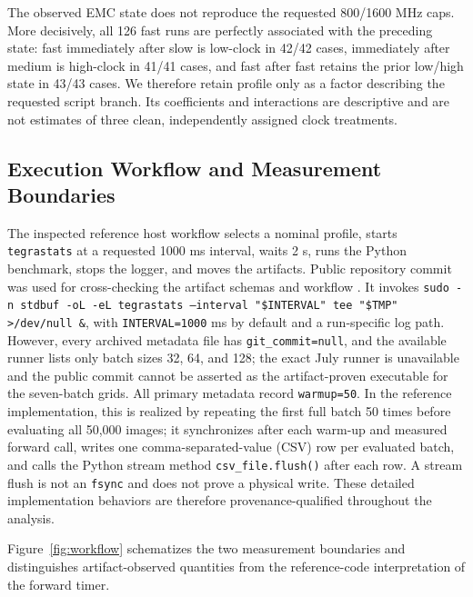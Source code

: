 \documentclass[electronics,article,submit,pdftex,moreauthors]{Definitions/mdpi}
\providecommand{\figref}[1]{Figure~\ref{#1}}
\begin{document}
The observed EMC state does not reproduce the requested 800/1600 MHz caps. More decisively, all 126 fast runs are perfectly associated with the preceding state: fast immediately after slow is low-clock in 42/42 cases, immediately after medium is high-clock in 41/41 cases, and fast after fast retains the prior low/high state in 43/43 cases. We therefore retain profile only as a factor describing the requested script branch. Its coefficients and interactions are descriptive and are not estimates of three clean, independently assigned clock treatments.

\subsection{Execution Workflow and Measurement Boundaries}

The inspected reference host workflow selects a nominal profile, starts \texttt{tegrastats} at a requested 1000 ms interval, waits 2 s, runs the Python benchmark, stops the logger, and moves the artifacts. Public repository commit \texttt{} was used for cross-checking the artifact schemas and workflow \cite{benchmarkrepo}. It invokes \texttt{sudo -n stdbuf -oL -eL tegrastats --interval "\$INTERVAL" \textbar{} tee "\$TMP" >/dev/null \&}, with \texttt{INTERVAL=1000} ms by default and a run-specific log path. However, every archived metadata file has \texttt{git\_commit=null}, and the available runner lists only batch sizes 32, 64, and 128; the exact July runner is unavailable and the public commit cannot be asserted as the artifact-proven executable for the seven-batch grids. All primary metadata record \texttt{warmup=50}. In the reference implementation, this is realized by repeating the first full batch 50 times before evaluating all 50,000 images; it synchronizes after each warm-up and measured forward call, writes one comma-separated-value (CSV) row per evaluated batch, and calls the Python stream method \texttt{csv\_file.flush()} after each row. A stream flush is not an \texttt{fsync} and does not prove a physical write. These detailed implementation behaviors are therefore provenance-qualified throughout the analysis.

\figref{fig:workflow} schematizes the two measurement boundaries and distinguishes artifact-observed quantities from the reference-code interpretation of the forward timer.
\end{document}
